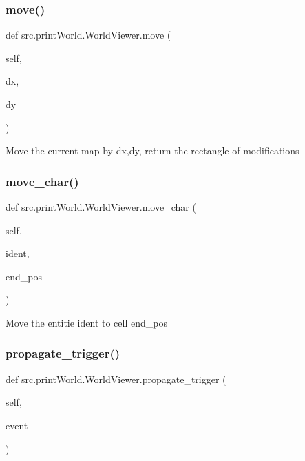 \subsubsection{\texorpdfstring{move()}{move()}}
{\footnotesize\ttfamily def src.\+print\+World.\+World\+Viewer.\+move (\begin{DoxyParamCaption}\item[{}]{self,  }\item[{}]{dx,  }\item[{}]{dy }\end{DoxyParamCaption})}

\begin{DoxyVerb}Move the current map by dx,dy, return the rectangle of
    modifications\end{DoxyVerb}
 \hypertarget{classsrc_1_1print_world_1_1_world_viewer_adb99e3c49a946770c248a7328a4e41fa}{}\label{classsrc_1_1print_world_1_1_world_viewer_adb99e3c49a946770c248a7328a4e41fa} 
\subsubsection{\texorpdfstring{move\+\_\+char()}{move\_char()}}
{\footnotesize\ttfamily def src.\+print\+World.\+World\+Viewer.\+move\+\_\+char (\begin{DoxyParamCaption}\item[{}]{self,  }\item[{}]{ident,  }\item[{}]{end\+\_\+pos }\end{DoxyParamCaption})}

\begin{DoxyVerb}Move the entitie ident to cell end_pos \end{DoxyVerb}
 \hypertarget{classsrc_1_1print_world_1_1_world_viewer_aa88c0d542161c9bbd5415f80c339d183}{}\label{classsrc_1_1print_world_1_1_world_viewer_aa88c0d542161c9bbd5415f80c339d183} 
\subsubsection{\texorpdfstring{propagate\+\_\+trigger()}{propagate\_trigger()}}
{\footnotesize\ttfamily def src.\+print\+World.\+World\+Viewer.\+propagate\+\_\+trigger (\begin{DoxyParamCaption}\item[{}]{self,  }\item[{}]{event }\end{DoxyParamCaption})}

